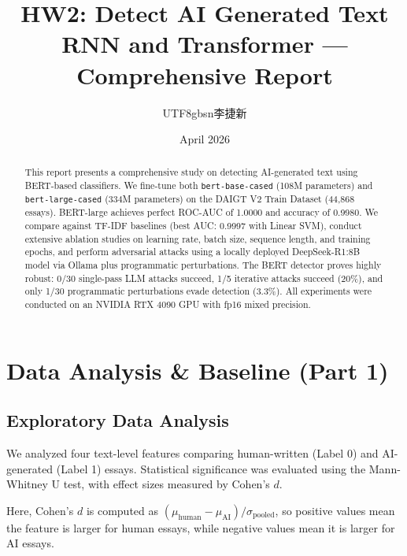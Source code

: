 \documentclass[11pt,a4paper]{article}
\title{\textbf{HW2: Detect AI Generated Text}\\[0.3em]
\large RNN and Transformer — Comprehensive Report}
\author{\begin{CJK*}{UTF8}{gbsn}李捷新\end{CJK*}}
\date{April 2026}
\begin{document}
\maketitle

\begin{abstract}
This report presents a comprehensive study on detecting AI-generated text using BERT-based classifiers. We fine-tune both \texttt{bert-base-cased} (108M parameters) and \texttt{bert-large-cased} (334M parameters) on the DAIGT V2 Train Dataset (44,868 essays). BERT-large achieves perfect ROC-AUC of 1.0000 and accuracy of 0.9980. We compare against TF-IDF baselines (best AUC: 0.9997 with Linear SVM), conduct extensive ablation studies on learning rate, batch size, sequence length, and training epochs, and perform adversarial attacks using a locally deployed DeepSeek-R1:8B model via Ollama plus programmatic perturbations. The BERT detector proves highly robust: 0/30 single-pass LLM attacks succeed, 1/5 iterative attacks succeed (20\%), and only 1/30 programmatic perturbations evade detection (3.3\%). All experiments were conducted on an NVIDIA RTX 4090 GPU with fp16 mixed precision.
\end{abstract}

\tableofcontents
\newpage

\section{Data Analysis \& Baseline (Part 1)}

\subsection{Exploratory Data Analysis}

We analyzed four text-level features comparing human-written (Label 0) and AI-generated (Label 1) essays. Statistical significance was evaluated using the Mann-Whitney U test, with effect sizes measured by Cohen's $d$.

Here, Cohen's $d$ is computed as $(\mu_{\text{human}} - \mu_{\text{AI}}) / \sigma_{\text{pooled}}$, so positive values mean the feature is larger for human essays, while negative values mean it is larger for AI essays.
\end{document}
